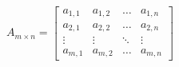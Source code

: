 \[
\boldsymbol{\mathit{A}}_{m \times n} = 
\begin{bmatrix}
    a_{1,1} & a_{1,2} & \dots & a_{1,n} \\
    a_{2,1} & a_{2,2} & \dots & a_{2,n} \\
    \vdots  & \vdots  & \ddots & \vdots  \\
    a_{m,1} & a_{m,2} & \dots & a_{m,n}
\end{bmatrix}
\]
